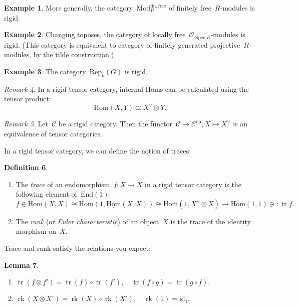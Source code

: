 \documentclass[a4paper,english,12pt]{scrartcl}
\theoremstyle{definition}
\newtheorem{defn}{Definition}[section]
\newtheorem{ex}[defn]{Example}
\theoremstyle{plain}
\newtheorem{lemma}[defn]{Lemma}
\theoremstyle{remark}
\newtheorem{rem}[defn]{Remark}
\renewcommand{\O}{\mathcal{O}}
\newcommand{\C}{\mathcal{C}}
\newcommand{\id}{\mathrm{id}}
\newcommand{\op}{\mathrm{op}}
\DeclareMathOperator{\Spec}{Spec}
\renewcommand{\_}{\mathpunct{.}\,}
\newcommand{\?}{\,{:}\,}
\newcommand{\Mod}{\mathrm{Mod}}
\newcommand{\Hom}{\underline{\mathrm{Hom}}}
\renewcommand{\hom}{\mathrm{Hom}}
\newcommand{\End}{\mathrm{End}}
\newcommand{\Rep}{\mathrm{Rep}}
\newcommand{\tr}{\operatorname{tr}}
\newcommand{\rk}{\operatorname{rk}}
\begin{document}
\begin{ex}More
generally, the category~$\Mod^\mathrm{fin.\,free}_R$ of finitely free~$R$-modules
is rigid.\end{ex}

\begin{ex}Changing toposes, the category of locally free~$\O_{\Spec R}$-modules
is rigid. (This category is equivalent to category of finitely generated
projective~$R$-modules, by the tilde construction.)\end{ex}

\begin{ex}The category~$\Rep_k(G)$ is rigid.\end{ex}

\begin{rem}In a rigid tensor category, internal Homs can be calculated using the
tensor product:
\[ \Hom(X,Y) \cong X^\vee \otimes Y. \]
\end{rem}

\begin{rem}Let~$\C$ be a rigid category. Then the functor~$\C \to \C^\op, X
\mapsto X^\vee$ is an equivalence of tensor categories.\end{rem}

In a rigid tensor category, we can define the notion of traces:
\begin{defn}\begin{enumerate}
\item The \emph{trace} of an endomorphism~$f : X \to X$ in a rigid tensor
category is the following element of~$\End(1)$:
\[ f \in \hom(X,X) \cong
  \hom(1,\Hom(X,X)) \cong
  \hom(1,X^\vee \otimes X) \to
  \hom(1,1) \ni: \tr f. \]
\item The \emph{rank} (or \emph{Euler characteristic}) of an object~$X$ is the
trace of the identity morphism on~$X$.
\end{enumerate}\end{defn}

Trace and rank satisfy the relations you expect:
\begin{lemma}\begin{enumerate}
\item $\tr(f \otimes f') = \tr(f) \circ \tr(f'), \quad
  \tr(f \circ g) = \tr(g \circ f).$
\item $\rk(X \otimes X') = \rk(X) \circ \rk(X'), \quad
  \rk(1) = \id_1.$
\end{enumerate}\end{lemma}
\end{document}
